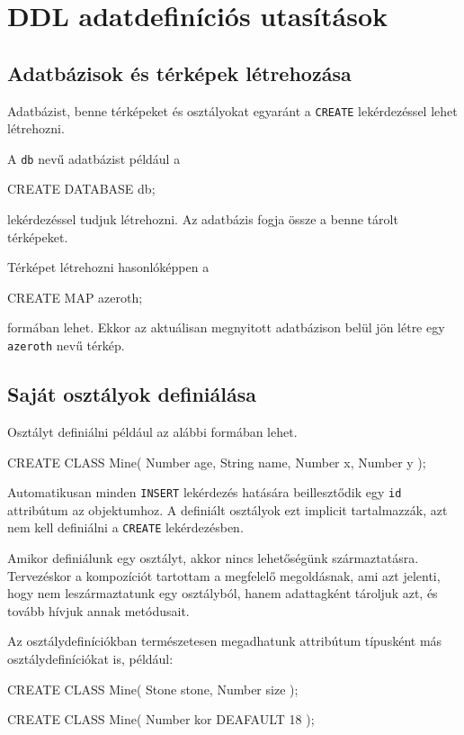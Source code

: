 \section{DDL adatdefiníciós utasítások}

\subsection{Adatbázisok és térképek létrehozása}

Adatbázist, benne térképeket és osztályokat egyaránt a \texttt{CREATE} lekérdezéssel lehet létrehozni.

A \texttt{db} nevű adatbázist például a
\begin{sql}
CREATE DATABASE db;
\end{sql}
lekérdezéssel tudjuk létrehozni. Az adatbázis fogja össze a benne tárolt térképeket. 

Térképet létrehozni hasonlóképpen a
\begin{sql}
CREATE MAP azeroth;
\end{sql}
formában lehet. Ekkor az aktuálisan megnyitott adatbázison belül jön létre egy \\ \texttt{azeroth} nevű térkép.

\subsection{Saját osztályok definiálása}

Osztályt definiálni például az alábbi formában lehet.
\begin{sql}
CREATE CLASS Mine(
    Number age,
    String name,
    Number x,
    Number y
); 
\end{sql}
Automatikusan minden \texttt{INSERT} lekérdezés hatására beillesztődik egy \texttt{id} attribútum az objektumhoz. A definiált osztályok ezt implicit tartalmazzák, azt nem kell definiálni a \texttt{CREATE} lekérdezésben.

Amikor definiálunk egy osztályt, akkor nincs lehetőségünk származtatásra. Tervezéskor a kompozíciót tartottam a megfelelő megoldásnak, ami azt jelenti, hogy nem leszármaztatunk egy osztályból, hanem adattagként tároljuk azt, és tovább hívjuk annak metódusait.

Az osztálydefiníciókban természetesen megadhatunk attribútum típusként más osztálydefiníciókat is, például:
\begin{sql}
CREATE CLASS Mine(
    Stone stone,
    Number size
);

CREATE CLASS Mine(
    Number kor DEAFAULT 18
);
\end{sql}

